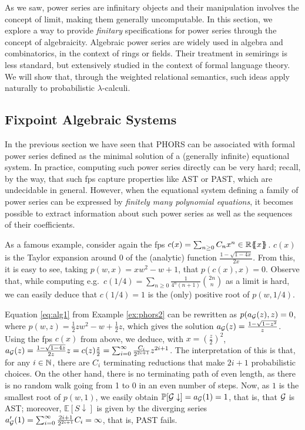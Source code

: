 
  
  As we saw, power series are infinitary objects and their manipulation involves the concept of limit, making them generally uncomputable. In this section, we explore a way to provide  \emph{finitary} specifications for power series through the concept of algebraicity. 
  Algebraic power series are widely used in algebra and combinatorics, in the context of rings or fields. Their treatment in semirings is less standard, but extensively studied in the context of formal language theory.
    We will show that, through the weighted relational semantics, such ideas apply naturally to  probabilistic $\lambda$-calculi.

\subsection{Fixpoint Algebraic Systems}
  
In the previous section we have seen that PHORS can be associated with formal power series defined as the minimal solution of a (generally infinite) equational system. In practice, computing such power series directly can be very hard; recall, by the way, that such fps capture properties like AST or PAST, which are undecidable in general. However, when the equational system defining a family of power series can be expressed by \emph{finitely many polynomial equations}, it becomes possible to extract information about such power series
as well as the sequences of their coefficients.

As a famous example, consider again the fps $c(x)= \sum_{n \geq 0} C_n x^{n} \in {\mathbb{R}}\{\!\!\{x\}\!\!\}$. $c(x)$ is the Taylor expansion around $0$ of the (analytic) function $\frac{1-\sqrt{1-4x}}{2x}$. From this, it is easy to see, taking $p(w, x)= xw^2 - w + 1$, that $p(c(x), x)=0$. Observe that, while computing e.g.~$c(1/4) = \sum_{n \geq 0} \frac{1}{4^n(n+1)} \binom{2n}{n}$ as a limit is hard, we can easily deduce that $c(1/4)=1$ is the (only) positive root of $p(w,1/4)$.

\begin{example}\label{ex:phors4}
Equation \eqref{eq:alg1} from Example \ref{ex:phors2} can be rewritten as $p(a_{\mathcal{G}}(z),z)=0$, where $p(w,z)=\frac{1}{2}zw^2-w+\frac{1}{2}z$, which gives the solution $a_{\mathcal{G}}(z)=\frac{1-\sqrt{1-z^2}}{z}$.
Using the fps $c(x)$ from above, we deduce, with $x=\left(\frac{z}{2}\right)^2$, 
$a_{\mathcal{G}}(z)=\frac{1-\sqrt{1-4z}}{2z}z=c(z)\frac{z}{2}=\sum_{i=0}^{\infty}\frac{C_i}{2^{2i+1}}z^{2i+1}$.
The interpretation of this is that, for any $i\in \mathbb{N}$, there are $C_i$ terminating reductions that make $2i+1$ probabilistic choices. On the other hand, there is no terminating path of even length, as there is no random walk going from 1 to 0 in an even number of steps.
Now, as $1$ is the smallest root of $p(w,1)$, we easily obtain $\mathbb P[\mathcal{G}\downarrow]=a_{\mathcal{G}}(1)=1$, that is, that $\mathcal{G}$ is AST; moreover, $\mathbb E[S\downarrow]$ is given by the diverging series $a'_{\mathcal{G}}(1)=\sum_{i=0}^{\infty}\frac{2i+1}{2^{2i+1}}C_i=
\infty$, that is, PAST fails.
\end{example}
  
